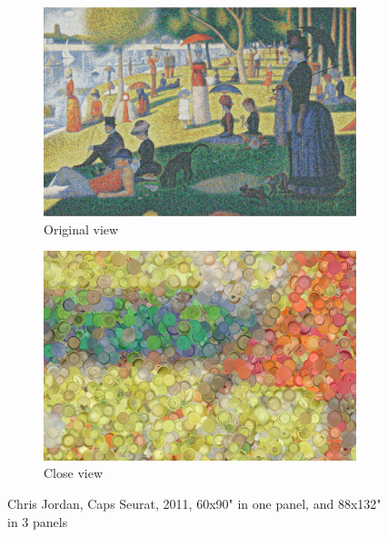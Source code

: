 \begin{figure}[h!]
\centering
\begin{subfigure}{.47\textwidth}
  \centering
  \includegraphics[width=\linewidth]{graphics/ChrisJordan_Numbers_OriginalView.jpg}
  \caption{Original view}
  \label{fig:ChrisJordan_Numbers_CloseView}
\end{subfigure}
\hfill
\begin{subfigure}{.47\textwidth}
  \centering
  \includegraphics[width=\linewidth]{graphics/ChrisJordan_Numbers_CloseView.jpg}
  \caption{Close view}
  \label{fig:ChrisJordan_Numbers_OriginalView}
\end{subfigure}
\caption{Chris Jordan, Caps Seurat, 2011, 60x90" in one panel, and 88x132" in 3 panels}
\label{fig:ChrisJordan_Numbers_CapsSeurat}
\end{figure}

